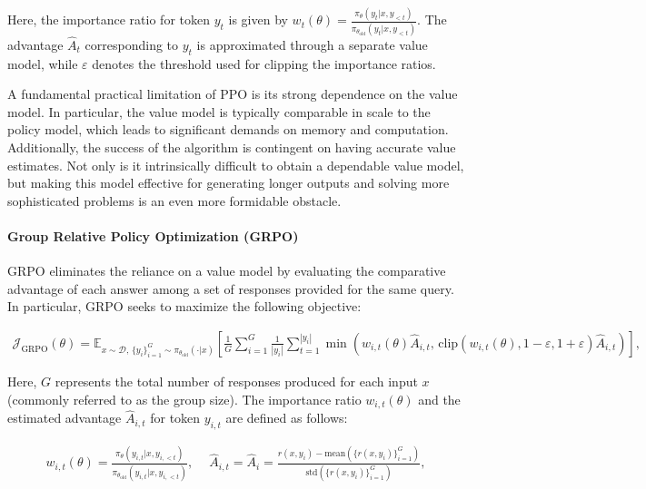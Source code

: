 Here, the importance ratio for token $y_t$ is given by $
w_{t}(\theta) = \frac{ \pi_{\theta} (y_{t} | x, y_{<t}) }{ \pi_{\theta_\text{old}} (y_{t} | x,y_{<t})} $. The advantage $\widehat{A}_{t}$ corresponding to $y_t$ is approximated through a separate value model, while $\varepsilon$ denotes the threshold used for clipping the importance ratios.

A fundamental practical limitation of PPO is its strong dependence on the value model. In particular, the value model is typically comparable in scale to the policy model, which leads to significant demands on memory and computation. Additionally, the success of the algorithm is contingent on having accurate value estimates. Not only is it intrinsically difficult to obtain a dependable value model, but making this model effective for generating longer outputs and solving more sophisticated problems is an even more formidable obstacle.

\paragraph{Group Relative Policy Optimization (GRPO)} GRPO \citep{grpo} eliminates the reliance on a value model by evaluating the comparative advantage of each answer among a set of responses provided for the same query. In particular, GRPO seeks to maximize the following objective:

\begin{align}
\label{equ:grpo}
\mathcal{J}_\text{GRPO}(\theta) = \mathbb{E}_{ x \sim \mathcal{D},\, \{y_i\}_{i=1}^G \sim \pi_{\theta_\text{old}}( \cdot | x) }
\left[ \frac{1}{G} \sum_{i=1}^{G} \frac{1}{|y_i|} \sum_{t=1}^{|y_i|} 
\min \left( w_{i,t}(\theta) \widehat{A}_{i,t},  \, \mathrm{clip} \left( w_{i,t}(\theta), 1 - {\varepsilon}, 1 + {\varepsilon}\right) \widehat{A}_{i,t} \right)
\right],
\end{align}

Here, $G$ represents the total number of responses produced for each input $x$ (commonly referred to as the group size). The importance ratio $w_{i,t}(\theta)$ and the estimated advantage $\widehat{A}_{i,t}$ for token $y_{i,t}$ are defined as follows:

\begin{align}
    w_{i,t}(\theta)=\frac{ \pi_{\theta} (y_{i,t} | x, y_{i,<t}) }{ \pi_{\theta_\text{old}} (y_{i,t} | x,y_{i,<t})},\quad\ 
    \widehat{A}_{i,t} = \widehat{A}_{i} = \frac{r(x, y_i) - \mathrm{mean} \left( \{ r(x, y_i) \}_{i=1}^G \right) }{ \mathrm{std} \left( \{ r(x, y_i) \}_{i=1}^G \right) },
\end{align}

